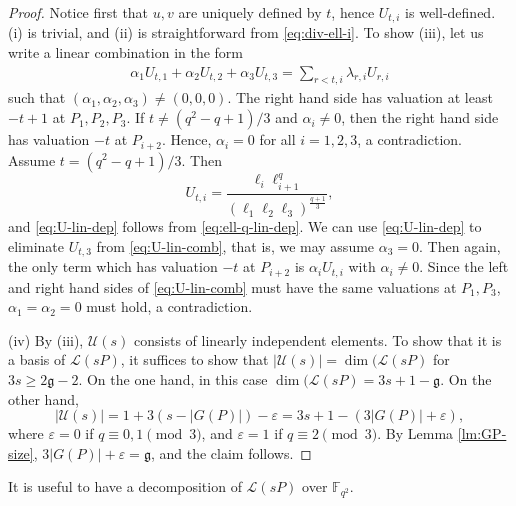 \documentclass[11pt]{amsart}
\theoremstyle{plain}
\theoremstyle{definition}
\theoremstyle{remark}
\newcommand{\g}{\mathfrak{g}}
\begin{document}
\begin{proof}
Notice first that $u,v$ are uniquely defined by $t$, hence $U_{t,i}$ is well-defined. (i) is trivial, and (ii) is straightforward from \eqref{eq:div-ell-i}. To show (iii), let us write a linear combination in the form
\begin{align} \label{eq:U-lin-comb}
\alpha_1 U_{t,1}+\alpha_2 U_{t,2} + \alpha_3 U_{t,3} = \sum_{r<t, i} \lambda_{r,i} U_{r,i}
\end{align}
such that $(\alpha_1,\alpha_2,\alpha_3)\neq (0,0,0)$. The right hand side has valuation at least $-t+1$ at $P_1,P_2,P_3$. If $t\neq (q^2-q+1)/3$ and $\alpha_i\neq 0$, then the right hand side has valuation $-t$ at $P_{i+2}$. Hence, $\alpha_i=0$ for all $i=1,2,3$, a contradiction. Assume $t=(q^2-q+1)/3$. Then
\[U_{t,i}=\frac{\ell_i\ell_{i+1}^q}{(\ell_1\ell_2\ell_3)^\frac{q+1}{3}},\]
and \eqref{eq:U-lin-dep} follows from \eqref{eq:ell-q-lin-dep}. We can use \eqref{eq:U-lin-dep} to eliminate $U_{t,3}$ from \eqref{eq:U-lin-comb}, that is, we may assume $\alpha_3=0$. Then again, the only term which has valuation $-t$ at $P_{i+2}$ is $\alpha_iU_{t,i}$ with $\alpha_i\neq 0$. Since the left and right hand sides of \eqref{eq:U-lin-comb} must have the same valuations at $P_1,P_3$, $\alpha_1=\alpha_2=0$ must hold, a contradiction. 

(iv) By (iii), $\mathcal{U}(s)$ consists of linearly independent elements. To show that it is a basis of $\mathscr{L}(sP)$, it suffices to show that $|\mathcal{U}(s)|=\dim(\mathscr{L}(sP)$ for $3s\geq 2\g-2$. On the one hand, in this case $\dim(\mathscr{L}(sP) = 3s+1-\g$. On the other hand, 
\[|\mathcal{U}(s)|=1+3(s-|G(P)|)-\varepsilon = 3s+1-(3|G(P)|+\varepsilon),\]
where $\varepsilon=0$ if $q\equiv0,1\pmod3$, and $\varepsilon=1$ if $q\equiv 2\pmod3$. By Lemma \ref{lm:GP-size}, $3|G(P)|+\varepsilon = \g$, and the claim follows. 
\end{proof}

It is useful to have a decomposition of $\mathscr{L}(sP)$ over $\mathbb{F}_{q^2}$.
\end{document}
